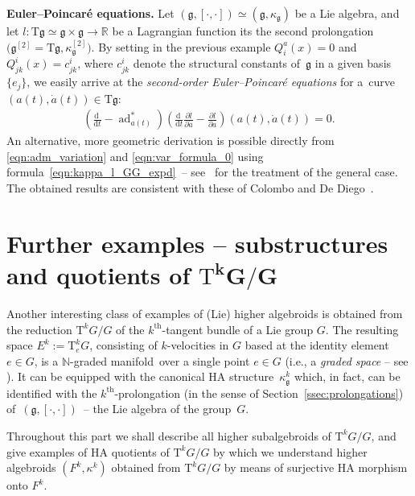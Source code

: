 \documentclass[pdftex]{sigma}
\newcommand{\grB}{{$\N$-graded manifold}}
\newcommand{\thh}[1]{#1^{\mathrm{th}}} %
\newcommand{\R}{\mathbb{R}}
\newcommand{\N}{\mathbb{N}}
\newcommand{\pa}{\partial}
\newcommand{\dd}{\mathrm{d}}
\newcommand{\ra}{\rightarrow}
\newcommand{\T}{\mathrm{T}} %
\newcommand{\TT}[1]{\mathrm{T}^{#1}} %
\newcommand{\g}{\mathfrak{g}} %
\numberwithin{equation}{section}
\theoremstyle{definition}
\begin{document}
{\bf Euler--Poincar\'{e} equations.} Let $(\g,[\cdot,\cdot])\simeq(\g,\kappa_{\g})$ be a Lie algebra, and let $l\colon \T\g\simeq \g\times\g\ra \R$ be a Lagrangian function its the second prolongation $\big(\g^{[2]}=\T\g,\kappa_{\g}^{[2]}\big)$. By setting in the previous example $Q^a_i(x)=0$ and $Q^i_{jk}(x)=c^i_{jk}$, where $c^i_{jk}$ denote the structural constants of~$\g$ in a given basis~$\{e_j\}$, we easily arrive at the \emph{second-order Euler--Poincar\'{e} equations} for a~curve $(a(t),\dot a(t))\in \T\g$:
\begin{gather}\label{eqn:EP}
\left(\frac{\dd\ }{\dd t}-\operatorname{ad}^\ast_{a(t)}\right)\left(\frac{\dd \ }{\dd t}\frac{\pa l}{\pa \dot a}-\frac{\pa l}{\pa a}\right)(a(t),\dot a(t))=0.
\end{gather}
An alternative, more geometric derivation is possible directly from \eqref{eqn:adm_variation} and \eqref{eqn:var_formula_0} using formula~\eqref{eqn:kappa_l_GG_expd}~-- see~\cite{MJ_MR_prototypes} for the treatment of the general case. The obtained results are consistent with these of Colombo and De Diego~\cite{Colombo_Diego_2014}.

\section[Further examples -- substructures and quotients of $\TT{k} G/G$]{Further examples -- substructures and quotients of $\boldsymbol{\TT{k} G/G}$}\label{sec:examples}

Another interesting class of examples of (Lie) higher algebroids is obtained from the reduction $\TT{k} G / G$ of the $\thh{k}$-tangent bundle of a Lie group $G$. The resulting space $E^k := \TT{k}_e G$, consisting of $k$-velocities in $G$ based at the identity element $e\in G$, is a \grB\ over a single point $e\in G$ (i.e., a \emph{graded space} -- see \cite{JG_MR_gr_bund_hgm_str_2011}). It can be equipped with the canonical HA structure~$\kappa^k_\g$ which, in fact, can be identified with the $\thh{k}$-prolongation (in the sense of Section~\ref{ssec:prolongations}) of~$(\g,[\cdot,\cdot])$~-- the Lie algebra of the group~$G$.

Throughout this part we shall describe all higher subalgebroids of $\TT{k} G / G$, and give examples of HA quotients of $\TT{k} G / G$ by which we understand higher algebroids $(F^k, \kappa^k)$ obtained from $\TT{k} G / G$ by means of surjective HA morphism onto $F^k$.
\end{document}
